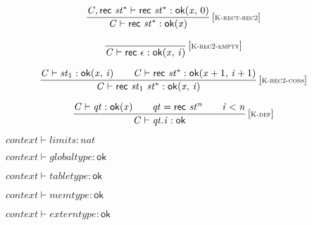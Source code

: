 $$
\begin{array}{@{}c@{}}\displaystyle
\frac{
{\mathit{C}}, \mathsf{rec}~{{\mathit{st}}^\ast} \vdash \mathsf{rec}~{{\mathit{st}}^\ast} : {\mathsf{ok}}{({\mathit{x}},\, 0)}
}{
{\mathit{C}} \vdash \mathsf{rec}~{{\mathit{st}}^\ast} : {\mathsf{ok}}{({\mathit{x}})}
} \, {[\textsc{\scriptsize K{-}rect{-}rec2}]}
\qquad
\end{array}
$$

$$
\begin{array}{@{}c@{}}\displaystyle
\frac{
}{
{\mathit{C}} \vdash \mathsf{rec}~\epsilon : {\mathsf{ok}}{({\mathit{x}},\, {\mathit{i}})}
} \, {[\textsc{\scriptsize K{-}rec2{-}empty}]}
\qquad
\end{array}
$$

$$
\begin{array}{@{}c@{}}\displaystyle
\frac{
{\mathit{C}} \vdash {\mathit{st}}_{{1}} : {\mathsf{ok}}{({\mathit{x}},\, {\mathit{i}})}
 \qquad
{\mathit{C}} \vdash \mathsf{rec}~{{\mathit{st}}^\ast} : {\mathsf{ok}}{({\mathit{x}} + 1,\, {\mathit{i}} + 1)}
}{
{\mathit{C}} \vdash \mathsf{rec}~{\mathit{st}}_{{1}}~{{\mathit{st}}^\ast} : {\mathsf{ok}}{({\mathit{x}},\, {\mathit{i}})}
} \, {[\textsc{\scriptsize K{-}rec2{-}cons}]}
\qquad
\end{array}
$$

\vspace{1ex}

$$
\begin{array}{@{}c@{}}\displaystyle
\frac{
{\mathit{C}} \vdash {\mathit{qt}} : {\mathsf{ok}}{({\mathit{x}})}
 \qquad
{\mathit{qt}} = \mathsf{rec}~{{\mathit{st}}^{{\mathit{n}}}}
 \qquad
{\mathit{i}} < {\mathit{n}}
}{
{\mathit{C}} \vdash {\mathit{qt}} . {\mathit{i}} : \mathsf{ok}
} \, {[\textsc{\scriptsize K{-}def}]}
\qquad
\end{array}
$$

\vspace{1ex}

$\boxed{{\mathit{context}} \vdash {\mathit{limits}} : {\mathit{nat}}}$

$\boxed{{\mathit{context}} \vdash {\mathit{globaltype}} : \mathsf{ok}}$

$\boxed{{\mathit{context}} \vdash {\mathit{tabletype}} : \mathsf{ok}}$

$\boxed{{\mathit{context}} \vdash {\mathit{memtype}} : \mathsf{ok}}$

$\boxed{{\mathit{context}} \vdash {\mathit{externtype}} : \mathsf{ok}}$

\vspace{1ex}

